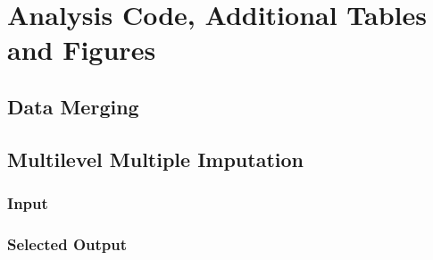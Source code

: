 \chapter{Analysis Code, Additional Tables and Figures}

\section{Data Merging}\label{R.reimport}

\begin{singlespacing}
    
\end{singlespacing}





\section{Multilevel Multiple Imputation}

\subsection{\cM Input}\label{sec:MMI}

\begin{singlespacing}
    
\end{singlespacing}

\subsection{Selected \cM Output}

\begin{singlespacing}
    
\end{singlespacing}



